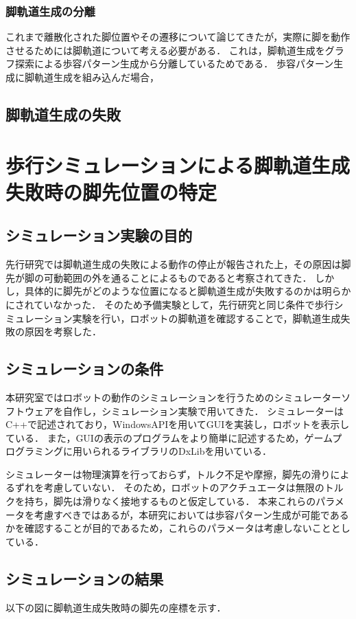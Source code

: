 \subsubsection{脚軌道生成の分離}
これまで離散化された脚位置やその遷移について論じてきたが，実際に脚を動作させるためには脚軌道について考える必要がある．
これは，脚軌道生成をグラフ探索による歩容パターン生成から分離しているためである．
歩容パターン生成に脚軌道生成を組み込んだ場合，

\subsection{脚軌道生成の失敗}


\section{歩行シミュレーションによる脚軌道生成失敗時の脚先位置の特定}

\subsection{シミュレーション実験の目的}
先行研究では脚軌道生成の失敗による動作の停止が報告された上，その原因は脚先が脚の可動範囲の外を通ることによるものであると考察されてきた．
しかし，具体的に脚先がどのような位置になると脚軌道生成が失敗するのかは明らかにされていなかった．
そのため予備実験として，先行研究と同じ条件で歩行シミュレーション実験を行い，ロボットの脚軌道を確認することで，脚軌道生成失敗の原因を考察した．

\subsection{シミュレーションの条件}
本研究室ではロボットの動作のシミュレーションを行うためのシミュレーターソフトウェアを自作し，シミュレーション実験で用いてきた．
シミュレーターはC++で記述されており，WindowsAPIを用いてGUIを実装し，ロボットを表示している．
また，GUIの表示のプログラムをより簡単に記述するため，ゲームプログラミングに用いられるライブラリのDxLibを用いている．

シミュレーターは物理演算を行っておらず，トルク不足や摩擦，脚先の滑りによるずれを考慮していない．
そのため，ロボットのアクチュエータは無限のトルクを持ち，脚先は滑りなく接地するものと仮定している．
本来これらのパラメータを考慮すべきではあるが，本研究においては歩容パターン生成が可能であるかを確認することが目的であるため，これらのパラメータは考慮しないこととしている．

\subsection{シミュレーションの結果}
以下の図に脚軌道生成失敗時の脚先の座標を示す．

